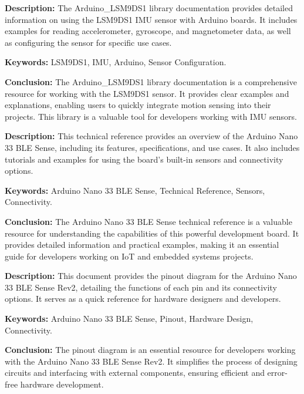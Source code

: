 {
	\textbf{Description:} The Arduino\_LSM9DS1 library documentation provides detailed information on using the LSM9DS1 IMU sensor with Arduino boards. It includes examples for reading accelerometer, gyroscope, and magnetometer data, as well as configuring the sensor for specific use cases.
	\newline
	
	\textbf{Keywords:} LSM9DS1, IMU, Arduino, Sensor Configuration.
	
	\newpage
	\textbf{Conclusion:} The Arduino\_LSM9DS1 library documentation is a comprehensive resource for working with the LSM9DS1 sensor. It provides clear examples and explanations, enabling users to quickly integrate motion sensing into their projects. This library is a valuable tool for developers working with IMU sensors\cite{arduinolsm9ds1}.
}

{
	\textbf{Description:} This technical reference provides an overview of the Arduino Nano 33 BLE Sense, including its features, specifications, and use cases. It also includes tutorials and examples for using the board's built-in sensors and connectivity options.
	\newline
	
	\textbf{Keywords:} Arduino Nano 33 BLE Sense, Technical Reference, Sensors, Connectivity.
	
	\newpage
	\textbf{Conclusion:} The Arduino Nano 33 BLE Sense technical reference is a valuable resource for understanding the capabilities of this powerful development board. It provides detailed information and practical examples, making it an essential guide for developers working on IoT and embedded systems projects\cite{ArduinoNano33Sense2025}.
}

{
	\textbf{Description:} This document provides the pinout diagram for the Arduino Nano 33 BLE Sense Rev2, detailing the functions of each pin and its connectivity options. It serves as a quick reference for hardware designers and developers.
	\newline
	
	\textbf{Keywords:} Arduino Nano 33 BLE Sense, Pinout, Hardware Design, Connectivity.
	
	\newpage
	\textbf{Conclusion:} The pinout diagram is an essential resource for developers working with the Arduino Nano 33 BLE Sense Rev2. It simplifies the process of designing circuits and interfacing with external components, ensuring efficient and error-free hardware development\cite{ArduinoPins:2024}.
}

